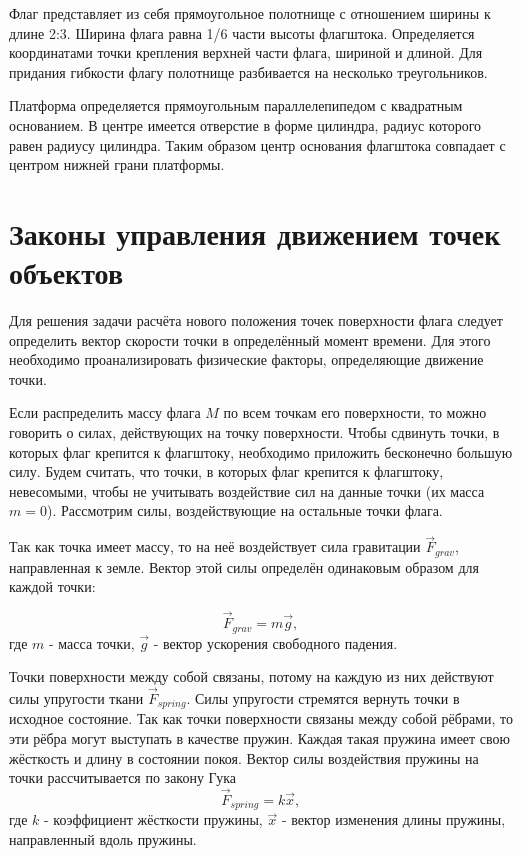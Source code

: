 \vspace{0.3cm}Флаг представляет из себя прямоугольное полотнище с отношением ширины к длине 2:3. Ширина флага равна 1/6 части высоты флагштока. Определяется координатами точки крепления верхней части флага, шириной и длиной. Для придания гибкости флагу полотнище разбивается на несколько треугольников. 

\vspace{0.3cm}Платформа определяется прямоугольным параллелепипедом с квадратным основанием. В центре имеется отверстие в форме цилиндра, радиус которого равен радиусу цилиндра. Таким образом центр основания флагштока совпадает с центром нижней грани платформы.

\section{Законы управления движением точек объектов}
\hspace{0.6cm}Для решения задачи расчёта нового положения точек поверхности флага следует определить вектор скорости точки в определённый момент времени. Для этого необходимо проанализировать физические факторы, определяющие движение точки.

\vspace{0.3cm}Если распределить массу флага $M$ по всем точкам его поверхности, то можно говорить о силах, действующих на точку поверхности. Чтобы сдвинуть точки, в которых флаг крепится к флагштоку, необходимо приложить бесконечно большую силу. Будем считать, что точки, в которых флаг крепится к флагштоку, невесомыми, чтобы не учитывать воздействие сил на данные точки (их масса $m = 0$). Рассмотрим силы, воздействующие на остальные точки флага.

\vspace{0.3cm}Так как точка имеет массу, то на неё воздействует сила гравитации $\vec{F}_{grav}$, направленная к земле. Вектор этой силы определён одинаковым образом для каждой точки:

\begin{equation}
\vec{F}_{grav} = m\vec{g} ,
\end{equation}
где $m$ - масса точки, $\vec{g}$ - вектор ускорения свободного падения.

\vspace{0.3cm}Точки поверхности между собой связаны, потому на каждую из них действуют силы упругости ткани $\vec{F}_{spring}$. Силы упругости стремятся вернуть точки в исходное состояние. Так как точки поверхности связаны между собой рёбрами, то эти рёбра могут выступать в качестве пружин. Каждая такая пружина имеет свою жёсткость и длину в состоянии покоя. Вектор силы воздействия пружины на точки рассчитывается по закону Гука
\begin{equation}
\vec{F}_{spring} = k\vec{x} ,
\end{equation}
где $k$ - коэффициент жёсткости пружины, $\vec{x}$ - вектор изменения длины пружины, направленный вдоль пружины.

